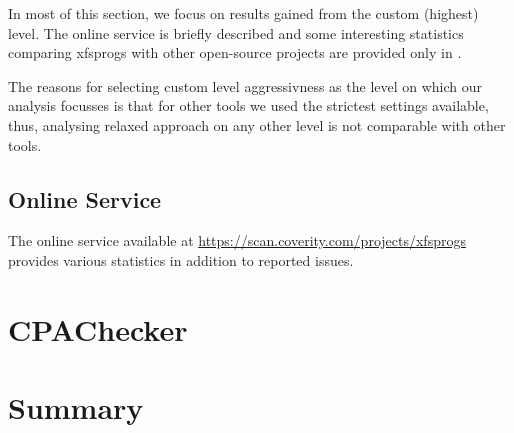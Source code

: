 In most of this section, we focus on results gained from the custom (highest)
level. The online service is briefly described and some interesting statistics
comparing xfsprogs with other open-source projects are provided only in
.

The reasons for selecting custom level aggressivness as the level on which our
analysis focusses is that for other tools we used the strictest settings
available, thus, analysing relaxed approach on any other level is not
comparable with other tools.

\subsection{Online Service}\label{chap:results:coverity:online}

The online service available at
\url{https://scan.coverity.com/projects/xfsprogs} provides various statistics
in addition to reported issues.

\section{CPAChecker}\label{chap:results:cpachecker}

\section{Summary}\label{chap:results:summary}

